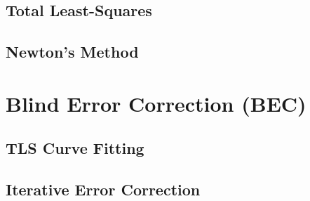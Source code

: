 \documentclass[10pt,twocolumn,a4paper,conference]{IEEEtran}
\begin{document}
\subsection{Total Least-Squares}



\subsection{Newton's Method} \label{sec:Newton}


\section{Blind Error Correction (BEC)} \label{sec:methods}  


\subsection{TLS Curve Fitting}


\subsection{Iterative Error Correction}


\end{document}
